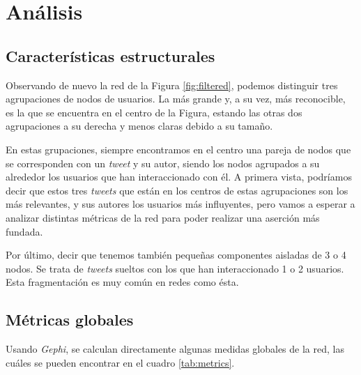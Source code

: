 \section{Análisis}

\subsection{Características estructurales}
\label{subsec:structure}

Observando de nuevo la red de la Figura \ref{fig:filtered}, podemos distinguir
tres agrupaciones de nodos de usuarios. La más grande y, a su vez, más
reconocible, es la que se encuentra en el centro de la Figura, estando las otras
dos agrupaciones a su derecha y menos claras debido a su tamaño.

En estas grupaciones, siempre encontramos en el centro una pareja de nodos que
se corresponden con un \textit{tweet} y su autor, siendo los nodos agrupados a
su alrededor los usuarios que han interaccionado con él. A primera vista,
podríamos decir que estos tres \textit{tweets} que están en los centros de estas
agrupaciones son los más relevantes, y sus autores los usuarios más influyentes,
pero vamos a esperar a analizar distintas métricas de la red para poder realizar
una aserción más fundada.

Por último, decir que tenemos también pequeñas componentes aisladas de 3 o 4
nodos. Se trata de \textit{tweets} sueltos con los que han interaccionado 1 o 2
usuarios. Esta fragmentación es muy común en redes como ésta.

\subsection{Métricas globales}

Usando \textit{Gephi}, se calculan directamente algunas medidas globales de la
red, las cuáles se pueden encontrar en el cuadro \ref{tab:metrics}.

